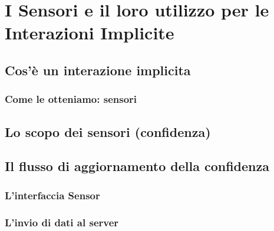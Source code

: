 \chapter{I Sensori e il loro utilizzo per le Interazioni Implicite}
\section{Cos'è un interazione implicita}
\subsection{Come le otteniamo: sensori}
\section{Lo scopo dei sensori (confidenza)}
\section{Il flusso di aggiornamento della confidenza}
\subsection{L'interfaccia Sensor}
\subsection{L'invio di dati al server}